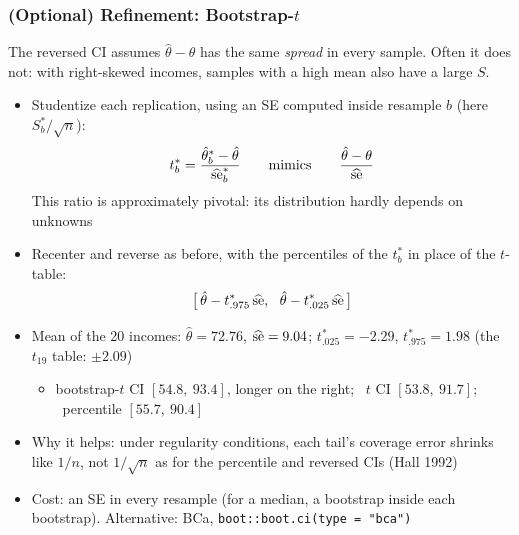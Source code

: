 \documentclass[xcolor=svgnames,9pt,english,aspectratio=169,t]{beamer}
\begin{document}
\begin{frame}
\frametitle{(Optional) Refinement: Bootstrap-$t$}
The reversed CI assumes $\hat\theta-\theta$ has the same \emph{spread} in every sample. Often it does not: with right-skewed incomes, samples with a high mean also have a large $S$.
\begin{itemize}[<+->]
\item \alert{Studentize} each replication, using an SE computed inside resample $b$ (here $S_b^\ast/\sqrt{n}$):
$$
t_b^\ast=\frac{\hat\theta_b^\ast-\hat\theta}{\widehat{\rm se}_b^\ast}
\qquad\text{mimics}\qquad
\frac{\hat\theta-\theta}{\widehat{\rm se}}
$$
This ratio is approximately \alert{pivotal}: its distribution hardly depends on unknowns
\item Recenter and reverse as before, with the percentiles of the $t_b^\ast$ in place of the $t$-table:
\vspace{-.5ex}$$\big[\,\hat\theta-t^\ast_{.975}\,\widehat{\rm se},\ \ \hat\theta-t^\ast_{.025}\,\widehat{\rm se}\,\big]$$
\item Mean of the 20 incomes: $\hat\theta=72.76$, $\widehat{\rm se}=9.04$; $t^\ast_{.025}=-2.29$, $t^\ast_{.975}=1.98$ (the $t_{19}$ table: $\pm 2.09$)
\begin{itemize}
\item bootstrap-$t$ CI $[54.8,\ 93.4]$, longer on the right; \ $t$ CI $[53.8,\ 91.7]$; \ percentile $[55.7,\ 90.4]$
\end{itemize}
\item Why it helps: under regularity conditions, each tail's coverage error shrinks like $1/n$, not $1/\sqrt{n}$ as for the percentile and reversed CIs (Hall 1992)
\item Cost: an SE in every resample (for a median, a bootstrap inside each bootstrap). Alternative: BCa, \texttt{boot::boot.ci(type = "bca")}
\end{itemize}
\end{frame}
\end{document}
